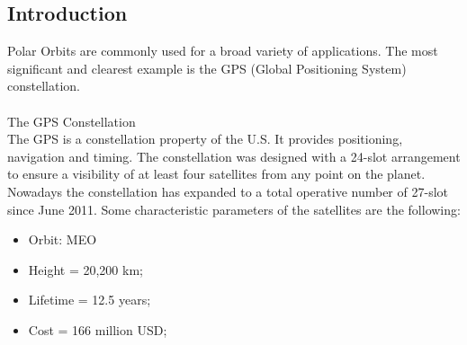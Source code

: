 %

\subsection{Introduction}
Polar Orbits are commonly used for a broad variety of applications. The most significant and clearest example is the GPS (Global Positioning System) constellation. 
\\
\\
The GPS Constellation
\\
The GPS is a constellation property of the U.S. It provides positioning, navigation and timing. The constellation was designed with a 24-slot arrangement to ensure a visibility of at least four satellites from any point on the planet. Nowadays the constellation has expanded to a total operative number of 27-slot since June 2011. Some characteristic parameters of the satellites are the following:

\begin{itemize}
\item Orbit: MEO
\item Height = 20,200 km;
\item Lifetime = 12.5 years;
\item Cost = 166 million USD;
\end{itemize}

